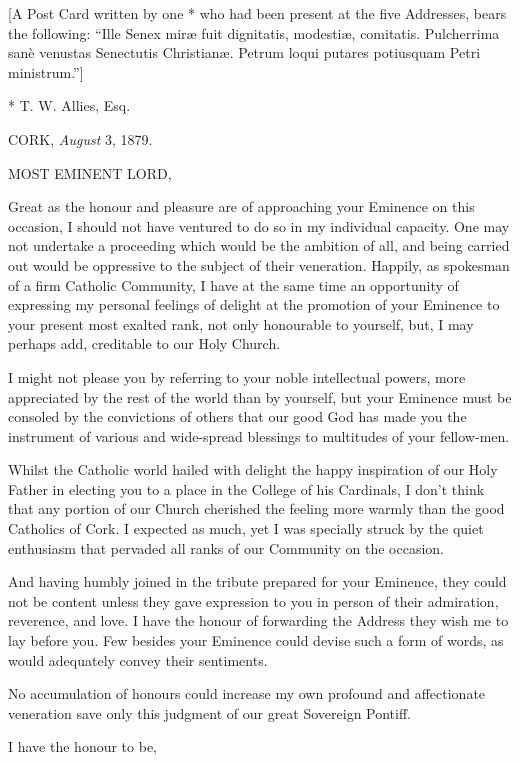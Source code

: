 [A Post Card written by one * who had been present at the five
Addresses, bears the following: ``Ille Senex miræ fuit dignitatis,
modestiæ, comitatis. Pulcherrima sanè venustas Senectutis
Christianæ. Petrum loqui putares potiusquam Petri ministrum.'']

* T. W. Allies, Esq.


CORK, \emph{August} 3, 1879.

MOST EMINENT LORD,

Great as the honour and pleasure are of approaching your Eminence on
this occasion, I should not have ventured to do so in my individual
capacity. One may not undertake a proceeding which would be the
ambition of all, and being carried out would be oppressive to the
subject of their veneration. Happily, as spokesman of a firm
Catholic Community, I have at the same time an opportunity of
expressing my personal feelings of delight at the promotion of your
Eminence to your present most exalted rank, not only honourable to
yourself, but, I may perhaps add, creditable to our Holy Church.

I might not please you by referring to your noble intellectual
powers, more appreciated by the rest of the world than by yourself,
but your Eminence must be consoled by the convictions of others that
our good God has made you the instrument of various and wide-spread
blessings to multitudes of your fellow-men.

Whilst the Catholic world hailed with delight the happy inspiration
of our Holy Father in electing you to a place in the College of his
Cardinals, I don't think that any portion of our Church cherished the
feeling more warmly than the good Catholics of Cork. I expected as
much, yet I was specially struck by the quiet enthusiasm that pervaded
all ranks of our Community on the occasion.

And having humbly joined in the tribute prepared for your Eminence,
they could not be content unless they gave expression to you in person
of their admiration, reverence, and love. I have the honour of
forwarding the Address they wish me to lay before you. Few besides
your Eminence could devise such a form of words, as would
adequately convey their sentiments.

No accumulation of honours could increase my own profound and
affectionate veneration save only this judgment of our great Sovereign
Pontiff.

I have the honour to be,

